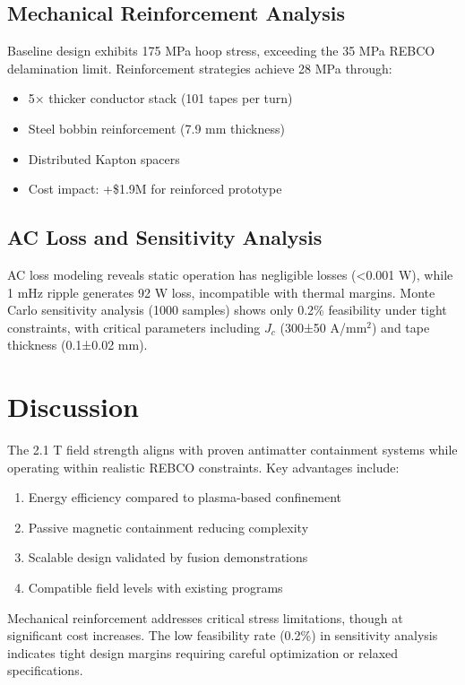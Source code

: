 \documentclass[10pt,twocolumn]{article}
\begin{document}
\subsection{Mechanical Reinforcement Analysis}

Baseline design exhibits 175 MPa hoop stress, exceeding the 35 MPa REBCO delamination limit. Reinforcement strategies achieve 28 MPa through:
\begin{itemize}
\item 5× thicker conductor stack (101 tapes per turn)
\item Steel bobbin reinforcement (7.9 mm thickness)  
\item Distributed Kapton spacers
\item Cost impact: +\$1.9M for reinforced prototype
\end{itemize}

\subsection{AC Loss and Sensitivity Analysis}

AC loss modeling reveals static operation has negligible losses (<0.001 W), while 1 mHz ripple generates 92 W loss, incompatible with thermal margins. Monte Carlo sensitivity analysis (1000 samples) shows only 0.2\% feasibility under tight constraints, with critical parameters including $J_c$ (300±50 A/mm$^2$) and tape thickness (0.1±0.02 mm).

\section{Discussion}

The 2.1 T field strength aligns with proven antimatter containment systems while operating within realistic REBCO constraints. Key advantages include:
\begin{enumerate}
\item Energy efficiency compared to plasma-based confinement
\item Passive magnetic containment reducing complexity
\item Scalable design validated by fusion demonstrations \cite{sparc2020}
\item Compatible field levels with existing programs \cite{alpha2023}
\end{enumerate}

Mechanical reinforcement addresses critical stress limitations, though at significant cost increases. The low feasibility rate (0.2\%) in sensitivity analysis indicates tight design margins requiring careful optimization or relaxed specifications.
\end{document}
